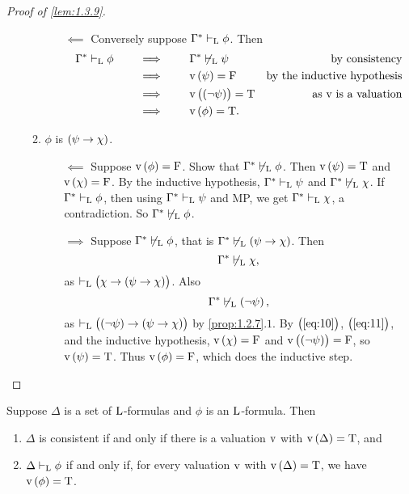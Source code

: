 \begin{proof}[Proof of \ref{lem:1.3.9}]
\begin{itemize}
\begin{enumerate}[leftmargin=0.5in, label=Case \arabic*.]
\begin{itemize}
\item[$ \impliedby $] Conversely suppose $ \Gamma^* \vdash_{\mathrm{L}} \phi $. Then
\begin{align*}
\Gamma^* \vdash_\L \phi \qquad
& \implies \qquad \Gamma^* \not\vdash_\L \psi & \text{by consistency} \\
& \implies \qquad \v\br{\psi} = \F & \text{by the inductive hypothesis} \\
& \implies \qquad \v\br{\notb{\psi}} = \T & \text{as} \ \v \ \text{is a valuation} \\
& \implies \qquad \v\br{\phi} = \T.
\end{align*}
\end{itemize}
\item $ \phi $ is $ \impb{\psi}{\chi} $.
\begin{itemize}
\item[$ \impliedby $] Suppose $ \v\br{\phi} = \F $. Show that $ \Gamma^* \not\vdash_{\mathrm{L}} \phi $. Then $ \v\br{\psi} = \T $ and $ \v\br{\chi} = \F $. By the inductive hypothesis, $ \Gamma^* \vdash_{\mathrm{L}} \psi $ and $ \Gamma^* \not\vdash_{\mathrm{L}} \chi $. If $ \Gamma^* \vdash_{\mathrm{L}} \phi $, then using $ \Gamma^* \vdash_{\mathrm{L}} \psi $ and MP, we get $ \Gamma^* \vdash_{\mathrm{L}} \chi $, a contradiction. So $ \Gamma^* \not\vdash_{\mathrm{L}} \phi $.
\item[$ \implies $] Suppose $ \Gamma^* \not\vdash_{\mathrm{L}} \phi $, that is $ \Gamma^* \not\vdash_\L \impb{\psi}{\chi} $. Then
\begin{equation}
\label{eq:10}
\Gamma^* \not\vdash_{\mathrm{L}} \chi,
\end{equation}
as $ \vdash_\L \impb{\chi}{\impb{\psi}{\chi}} $. Also
\begin{equation}
\label{eq:11}
\Gamma^* \not\vdash_\L \notb{\psi},
\end{equation}
as $ \vdash_\L \impb{\notb{\psi}}{\impb{\psi}{\chi}} $ by \ref{prop:1.2.7}.$ 1 $. By $ \br{\ref{eq:10}} $, $ \br{\ref{eq:11}} $, and the inductive hypothesis, $ \v\br{\chi} = \F $ and $ \v\br{\notb{\psi}} = \F $, so $ \v\br{\psi} = \T $. Thus $ \v\br{\phi} = \F $, which does the inductive step.
\end{itemize}
\end{enumerate}
\end{itemize}
\end{proof}

\begin{corollary}
\label{cor:1.3.11}
Suppose $ \Delta $ is a set of $ \mathrm{L} $-formulas and $ \phi $ is an $ \mathrm{L} $-formula. Then
\begin{enumerate}
\item $ \Delta $ is consistent if and only if there is a valuation $ \mathrm{v} $ with $ \v\br{\Delta} = \T $, and
\item $ \Delta \vdash_{\mathrm{L}} \phi $ if and only if, for every valuation $ \mathrm{v} $ with $ \v\br{\Delta} = \T $, we have $ \v\br{\phi} = \T $.
\end{enumerate}
\end{corollary}

